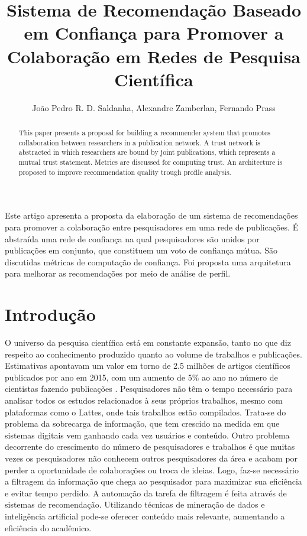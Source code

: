 \documentclass[12pt]{article}
\title{Sistema de Recomendação Baseado em Confiança para Promover a Colaboração em Redes de Pesquisa Científica}
\author{João Pedro R. D. Saldanha\inst{1}, Alexandre Zamberlan\inst{1}, Fernando Prass\inst{1}}
\begin{document}
 

\maketitle

\begin{abstract}
  This paper presents a proposal for building a recommender system that promotes collaboration between researchers in a publication network. A trust network is abstracted in which researchers are bound by joint publications, which represents a mutual trust statement. Metrics are discussed for  computing trust. An architecture is proposed to improve recommendation quality trough profile analysis.
\end{abstract}

\begin{resumo} 
  Este artigo apresenta a proposta da elaboração de um sistema de recomendações para promover a colaboração entre pesquisadores em uma rede de publicações. É abstraída uma rede de confiança na qual pesquisadores são unidos por publicações em conjunto, que constituem um voto de confiança mútua. São discutidas métricas de computação de confiança. Foi proposta uma arquitetura para melhorar as recomendações por meio de análise de perfil.
\end{resumo}

\section{Introdução}

O universo da pesquisa científica está em constante expansão, tanto no que diz respeito ao conhecimento produzido quanto ao volume de trabalhos e publicações. Estimativas apontavam um valor em torno de 2.5 milhões de artigos científicos publicados por ano em 2015, com um aumento de 5\% ao ano no número de cientistas fazendo publicações \cite{ware2015stm}. Pesquisadores não têm o tempo necessário para analisar todos os estudos relacionados à seus próprios trabalhos, mesmo com plataformas como o Lattes, onde tais trabalhos estão compilados. Trata-se do problema da sobrecarga de informação, que tem crescido na medida em que sistemas digitais vem ganhando cada vez usuários e conteúdo. Outro problema decorrente do crescimento do número de pesquisadores e trabalhos é que muitas vezes os pesquisadores não conhecem outros pesquisadores da área e acabam por perder a oportunidade de colaborações ou troca de ideias. Logo, faz-se necessário a filtragem da informação que chega ao pesquisador para maximizar sua eficiência e evitar tempo perdido. A automação da tarefa de filtragem é feita através de sistemas de recomendação. Utilizando técnicas de mineração de dados e inteligência artificial pode-se oferecer conteúdo mais relevante, aumentando a eficiência do acadêmico. 
\end{document}

